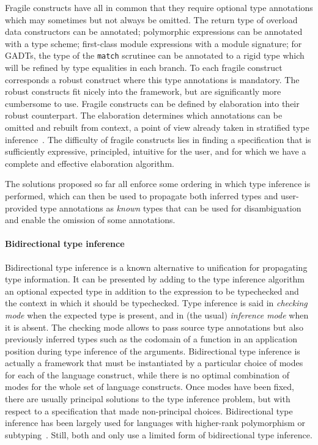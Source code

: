 \documentclass[acmsmall,screen,nonacm]{acmart}
\begin{document}
Fragile constructs have all in common that they require optional
type annotations which may sometimes but not always be
omitted. The return type of overload data constructors can be
annotated; polymorphic expressions can be annotated with a type
scheme; first-class module expressions with a module signature; for
GADTs, the type of the \texttt{match} scrutinee can be annotated to
a rigid type which will be refined by type equalities in each
branch. To each fragile construct corresponds a robust construct where
this type annotations is mandatory. The robust constructs fit nicely into
the \ML 
framework, but are significantly more cumbersome to use. Fragile
constructs can be defined by elaboration into their robust
counterpart. The elaboration determines which annotations can be
omitted and rebuilt from context, a point of view already taken in
stratified type inference~\cite
{Pottier-Regis-Gianas/stratified@popl06}.
%
The difficulty of fragile constructs lies in finding a specification
that is sufficiently expressive, principled, intuitive for the user,
and for which we have a complete and effective elaboration algorithm.

The solutions proposed so far all enforce some ordering in which type
inference is performed, which can then be used to propagate both inferred
types and user-provided type annotations as \emph{known} types that can be
used for disambiguation and enable the omission of some annotations.

\paragraph{Bidirectional type inference}

Bidirectional type inference is a known alternative to unification for
propagating type information. It can be presented by adding to the type
inference algorithm an optional expected type in addition to the expression
to be typechecked and the context in which it should be typechecked.  Type
inference is said in \emph{checking mode} when the expected type is present,
and in (the usual) \emph{inference mode} when it is absent. The checking
mode allows to pass source type annotations but also previously inferred
types such as the codomain of a function in an application position during
type inference of the arguments.
%
Bidirectional type inference is actually a framework that must be
instantiated by a particular choice of modes for each of the language
construct, while there is no optimal combination of modes for the whole set
of language constructs. Once modes have been fixed, there are usually
principal solutions to the type inference problem, but with respect to a
specification that made non-principal choices.
%
Bidirectional type inference has been largely used for languages with
higher-rank polymorphism or subtyping~. Still, both \OCaml
and \Haskell only use a limited form of bidirectional type inference.
\end{document}

